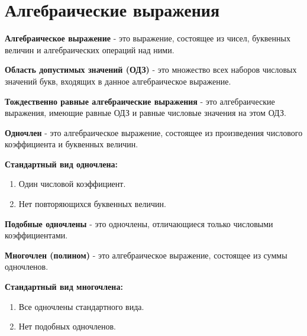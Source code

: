\documentclass[oneside]{book}
\begin{document}
	\chapter{Алгебраические выражения}
	\textbf{Алгебраическое выражение} - это
	выражение, состоящее из чисел,
	буквенных величин и алгебраических
	операций над ними.
	
	\textbf{Область допустимых значений (ОДЗ)} - это
	множество всех наборов числовых
	значений букв, входящих
	в данное алгебраическое выражение.

	\textbf{Тождественно равные алгебраические выражения} - это
	алгебраические выражения, имеющие равные ОДЗ и равные
	числовые значения на этом ОДЗ.
	
	\textbf{Одночлен} - это
	алгебраическое выражение,
	состоящее из произведения числового коэффициента
	и буквенных величин.

	\textbf{Стандартный вид одночлена:}
	\begin{enumerate}
		\item Один числовой коэффициент.
		\item Нет повторяющихся буквенных величин.
	\end{enumerate}

	\textbf{Подобные одночлены} - это
	одночлены, отличающиеся только числовыми
	коэффициентами.

	\textbf{Многочлен (полином)} - это
	алгебраическое выражение,
	состоящее из суммы одночленов.

	\textbf{Стандартный вид многочлена:}
	\begin{enumerate}
		\item Все одночлены стандартного вида.
		\item Нет подобных одночленов.
	\end{enumerate}
\end{document}
